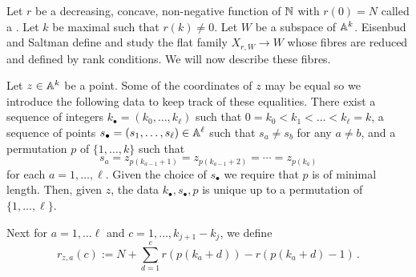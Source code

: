 \documentclass{article} %
\begin{document}
Let $ r $ be a decreasing, concave, non-negative function of $\NN$ with $r(0) = N$ called a .  Let $k $ be maximal such that $ r(k) \ne 0 $.
% 
Let $ W$ be a subspace of $ \AA^k$. Eisenbud and Saltman define and study the flat family $ X_{r,W} \rightarrow W$ whose fibres are reduced and defined by rank conditions. We will now describe these fibres. 

Let $ z \in \AA^k$ be a point. Some of the coordinates of $z$ may be equal so we introduce the following data to keep track of these equalities. There exist a sequence of integers $k_\bullet = (k_0,\dots,k_\ell)$ such that $ 0=k_0< k_1< \dots < k_\ell = k $, a sequence of points $s_\bullet = (s_1, \dots, s_\ell )\in\AA^\ell$ such that $s_a\ne s_b$ for any $a\ne b$, and a permutation  $ p $ of $ \{1, \dots, k\}$ such that 
$$ 
    s_a = z_{p(k_{a-1}+1)} = z_{p(k_{a-1} + 2)} =  \cdots = z_{p(k_a)}
$$ 
for each $a = 1,\dots,\ell$. 
Given the choice of $ s_\bullet$ we require that $ p $ is of minimal length. 
Then, given $z$, the data $k_\bullet, s_\bullet, p$ is unique up to a permutation of $ \{1, \dots, \ell\}$.
% 
% 

Next for $ a = 1, \dots \ell $ and $ c = 1, \dots, k_{j+1} - k_j$, we define
$$
    r_{z,a}(c):= N + \sum_{d = 1}^c r(p(k_a + d)) - r(p(k_a + d) - 1)  \, . 
$$
\end{document}
